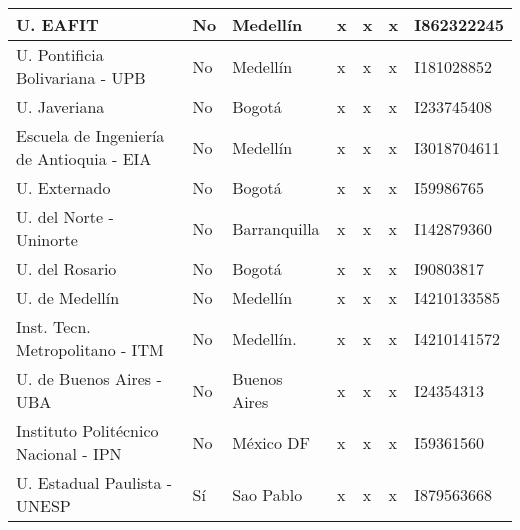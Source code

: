 \documentclass[
11pt, %
letter, %
oneside, %
]{article} %
\begin{document}
\begin{small}
\begin{table}[ht!]
\begin{center}
\begin{tabular}{|M{2.8cm}|M{1.5cm}|M{2.3cm}|M{1.4cm}|M{1.4cm}|M{1.4cm}|M{1.8cm}|}
				\vspace{2mm} U. EAFIT   \vspace{1mm}  & No & Medellín & x & x & x & I862322245 \\ \hline
				\vspace{2mm} U. Pontificia Bolivariana  \vspace{1mm} -  UPB & No & Medellín & x & x & x & I181028852\\ \hline			
				\vspace{2mm} U.  Javeriana \vspace{1mm} & No & Bogotá & x & x & x& I233745408 \\ \hline		
				\vspace{2mm} Escuela de Ingeniería de Antioquia \vspace{1mm} -  EIA & No & Medellín & x & x & x & I3018704611 \\ \hline	
				\vspace{2mm} U. Externado  \vspace{1mm} & No & Bogotá & x & x & x & I59986765 \\ \hline	
				\vspace{2mm} U. del Norte  \vspace{1mm} - Uninorte & No & Barranquilla & x & x & x & I142879360\\ \hline			
				\vspace{2mm} U. del Rosario  \vspace{1mm}  & No & Bogotá & x & x & x & I90803817 \\ \hline
				\vspace{2mm} U. de Medellín  \vspace{1mm}  & No & Medellín & x & x & x & I4210133585 \\ \hline			
				\vspace{2mm} Inst. Tecn. Metropolitano - ITM  \vspace{1mm}  & No & Medellín. & x & x & x& I4210141572\\ \hline
				\vspace{2mm} U. de Buenos Aires - UBA \vspace{1mm}  & No & Buenos Aires & x & x & x & I24354313 \\ \hline
				\vspace{2mm} Instituto Politécnico Nacional - IPN \vspace{1mm}  & No & México DF & x & x & x & I59361560 \\ \hline				
				\vspace{2mm} U. Estadual Paulista - UNESP   & Sí & Sao Pablo & x & x & x & I879563668\\ \hline

\end{tabular}
\end{center}
\end{table}
\end{small}
\end{document}
